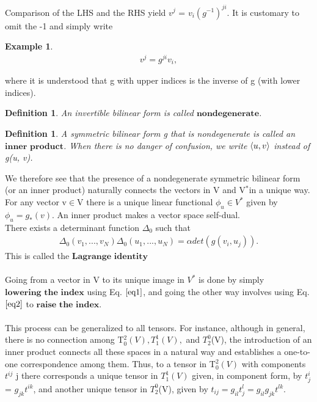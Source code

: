 \documentclass[12pt,a4paper]{article}
\newtheorem{defn}[thm]{Definition}
\newtheorem{exmp}{Example}[section]
\begin{document}
\indent Comparison of the LHS and the RHS yield $v^j$ = $v_i(g^{-1})^{ji}$. It is customary
to omit the -1 and simply write \\
\begin{exmp}\label{eq2}
\begin{eqnarray*} 
v^j = g ^ {ji} v_{i},
\end{eqnarray*}
\end{exmp}
where it is understood that g with upper indices is the inverse of g (with
lower indices). \\
\begin{defn}
An invertible bilinear form is called $\textbf{nondegenerate}$.
\end{defn}
\begin{defn}
A symmetric bilinear form g that is nondegenerate is called an $\textbf{inner product}$. When there is no danger of confusion, we write $\braket{u, v}$ instead of g(u, v).
\end{defn}
We therefore see that the presence of a nondegenerate symmetric bilinear
form (or an inner product) naturally connects the vectors in V and V$^*$in a
unique way. For any vector v$\in$V there is a unique linear functional $\phi_u \in V^*$
given by $\phi_u = g_*(v)$. An inner product
makes a vector space self-dual. \\There exists a determinant function $\Delta_0$ such that
\begin{eqnarray*}
\Delta_0 (v_1, ... , v_N) \Delta_0 ( u_1, ..., u_N) = \alpha det(g(v_i, u_j)).
\end{eqnarray*}
This is called the $\textbf{Lagrange identity}$\\
\\
Going from a vector in V to its unique image in $V^*$ is done by simply $\textbf{lowering the index}$ using Eq. $\ref{eq1}$, and going the other way involves using Eq. $\ref{eq2}$ to $\textbf{raise the index}$.\\
\\
This process can be generalized to all tensors. For instance, although in general, there is no connection among T$^2_0(V), T^1_1(V),$ and $T_2^0$(V), the introduction of an inner product connects all
these spaces in a natural way and establishes a one-to-one correspondence
among them. Thus, to a tensor in T$^2_0(V)$ with components $t^{ij}$ j there corresponds a unique tensor in $T^1_1(V)$ given, in component form, by $t_j^i$ = $g_{jk}t^{ik}$, and another unique tensor in $T_2^0$(V), given by $t_{ij} = g_{il} t^l_j = g_{il} g_{jk} t^{lk}$.\\\\
\end{document}

